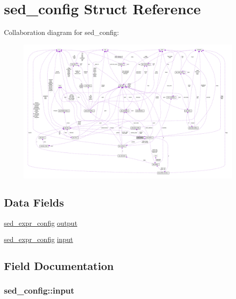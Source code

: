 \hypertarget{structsed__config}{}\section{sed\+\_\+config Struct Reference}
\label{structsed__config}


Collaboration diagram for sed\+\_\+config\+:
\nopagebreak
\begin{figure}[H]
\begin{center}
\leavevmode
\includegraphics[width=350pt]{structsed__config__coll__graph}
\end{center}
\end{figure}
\subsection*{Data Fields}
\begin{DoxyCompactItemize}
\item 
\hyperlink{structsed__expr__config}{sed\+\_\+expr\+\_\+config} \hyperlink{structsed__config_a44ea64e23d5cc2649d18f44ba92adaab}{output}
\item 
\hyperlink{structsed__expr__config}{sed\+\_\+expr\+\_\+config} \hyperlink{structsed__config_ac9e27a27a184acf270ad879dd1a2f528}{input}
\end{DoxyCompactItemize}


\subsection{Field Documentation}
\subsubsection[{\texorpdfstring{input}{input}}]{ sed\+\_\+config\+::input}\hypertarget{structsed__config_ac9e27a27a184acf270ad879dd1a2f528}{}\label{structsed__config_ac9e27a27a184acf270ad879dd1a2f528}
